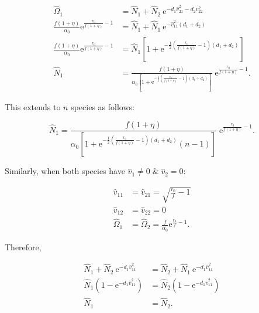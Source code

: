 \begin{equation} \label{eq:two-traits-v1-v2-equal-N}
\begin{split}
    \hat\Omega_1 &= \hat{N}_1 + \hat{N}_2 \: \text{e}^{-d_1 \hat{v}_{21}^2 -
        d_2 v_{22}^2} \\
    \frac{f (1 + \eta)}{\alpha_0} \text{e}^{\frac{r_0}{f (1 + \eta)} - 1} &=
        \hat{N}_1 + \hat{N}_1 \: \text{e}^{- \hat{v}_{11}^2 (d_1 + d_2)} \\
    \frac{f (1 + \eta)}{\alpha_0} \text{e}^{\frac{r_0}{f (1 + \eta)} - 1} &=
        \hat{N}_1 \left[ 1 + \text{e}^{- \frac{1}{2} \left(
            \frac{r_0}{f (1 + \eta)} - 1 \right) (d_1 + d_2)} \right] \\
    \hat{N}_1 &= \frac{f (1 + \eta)}{\alpha_0  \left[ 1 + \text{e}^{- \frac{1}{2} \left(
        \frac{r_0}{f (1 + \eta)} - 1 \right) (d_1 + d_2)} \right] } \;
        \text{e}^{\frac{r_0}{f (1 + \eta)} - 1}
    \text{.}
\end{split}
\end{equation}


This extends to $n$ species as follows:

\begin{equation} \label{eq:two-traits-v1-v2-equal-N-n-species}
    \hat{N}_1 = \frac{f (1 + \eta)}{\alpha_0  \left[ 1 + \text{e}^{- \frac{1}{2} \left(
        \frac{r_0}{f (1 + \eta)} - 1 \right) (d_1 + d_2)}  (n - 1) \right] } \;
        \text{e}^{\frac{r_0}{f (1 + \eta)} - 1}
    \text{.}
\end{equation}




Similarly, when both species have $\hat{v}_1 \ne 0 \; \& \; \hat{v}_2 = 0$:

\begin{equation*}
\begin{split}
    \hat{v}_{11} &= \hat{v}_{21} = \sqrt{ \frac{ r_0 }{ f } - 1 } \\
    \hat{v}_{12} &= \hat{v}_{22} = 0 \\
    \hat\Omega_1 &= \hat\Omega_2 = \frac{f}{\alpha_0} \textrm{e}^{\frac{r_0}{f} - 1}
    \text{.}
\end{split}
\end{equation*}

\noindent Therefore,

\begin{equation} \label{eq:two-traits-v1-nonzero-v2-zero-N1-N2}
\begin{split}
    \hat{N}_1 + \hat{N}_2 \: \text{e}^{- d_1 \hat{v}_{11}^2 } &=
        \hat{N}_2 + \hat{N}_1 \: \text{e}^{- d_1 \hat{v}_{11}^2 } \\
    \hat{N}_1 \left( 1 - \text{e}^{- d_1 \hat{v}_{11}^2 } \right) &=
        \hat{N}_2 \left( 1 - \text{e}^{- d_1 \hat{v}_{11}^2 } \right) \\
    \hat{N}_1 &= \hat{N}_2
    \text{.}
\end{split}
\end{equation}

